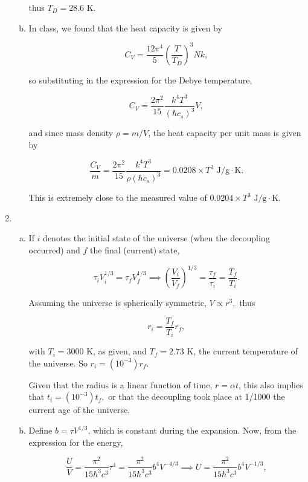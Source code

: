 \documentclass{article}
\begin{document}
\begin{enumerate}
\begin{enumerate}[(a)]
		thus $T_D = 28.6$ K.

		\item

		In class, we found that the heat capacity is given by

		$$C_V = \frac{12 \pi^4}{5} \left(\frac{T}{T_D}\right)^3 N k,$$

		so substituting in the expression for the Debye temperature,

		$$C_V = \frac{2 \pi^2}{15} \frac{k^4 T^3}{(\hbar c_s)^3}V,$$

		and since mass density $\rho = m/V$, the heat capacity per unit mass is given by

		$$\frac{C_V}{m} = \frac{2 \pi^2}{15} \frac{k^4 T^3}{\rho (\hbar c_s)^3} = 0.0208 \times T^3 \text{ J/g} \cdot \text{K}.$$

		This is extremely close to the measured value of $0.0204 \times T^3 \text{ J/g} \cdot \text{K}$.

	\end{enumerate}

	\item

	\begin{enumerate}[(a)]

		\item

		If $i$ denotes the initial state of the universe (when the decoupling occurred) and $f$ the final (current) state, 

		$$\tau _i V_i^{1/3} = \tau_f V_f^{1/3} \implies \left( \frac{V_i}{V_f} \right)^{1/3} = \frac{\tau_f}{\tau_i} = \frac{T_f}{T_i}.$$

		Assuming the universe is spherically symmetric, $V \propto r^3,$ thus

		$$r_i = \frac{T_f}{T_i} r_f,$$

		with $T_i = 3000$ K, as given, and $T_f = 2.73$ K, the current temperature of the universe. So $r_i = (10^{-3}) r_f$.

		Given that the radius is a linear function of time, $r = \alpha t$, this also implies that $t_i = (10^{-3}) t_f,$ or that the decoupling took place at 1/1000 the current age of the universe.

		\item

		Define $b = \tau V^{1/3}$, which is constant during the expansion. Now, from the expression for the energy,

		$$\frac{U}{V} = \frac{\pi^2}{15 \hbar^3 c^3} \tau^4 = \frac{\pi^2}{15 \hbar^3 c^3} b^4 V^{-4/3} \implies U = \frac{\pi^2}{15 \hbar^3 c^3} b^4 V^{-1/3},$$


\end{enumerate}
\end{enumerate}
\end{document}
